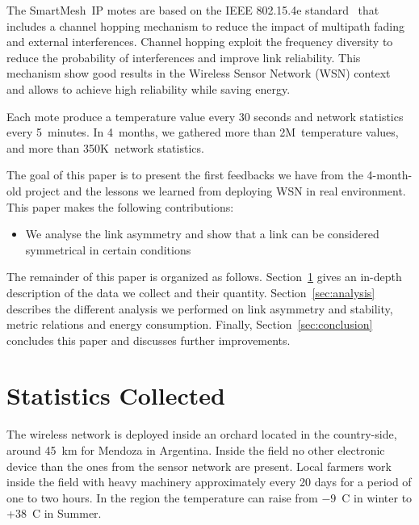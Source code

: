 \documentclass{sig-alternate}
\newcommand{\smip}           {SmartMesh~IP\xspace}
\begin{document}

The \smip motes are based on the IEEE 802.15.4e standard~\cite{std_ieee802154e} that includes a channel hopping mechanism to reduce the impact of multipath fading and external interferences.
Channel hopping exploit the frequency diversity to reduce the probability of interferences and improve link reliability.
This mechanism show good results in the Wireless Sensor Network (WSN) context~\cite{watteyne2010mitigating, watteyne2009reliability} and allows to achieve high reliability while saving energy.


Each mote produce a temperature value every 30 seconds and network statistics every 5~minutes.
In 4~months, we gathered more than 2M~temperature values, and more than 350K~network statistics.


The goal of this paper is to present the first feedbacks we have from the 4-month-old project and the lessons we learned from deploying WSN in real environment.
This paper makes the following contributions:
\begin{itemize}
    \item{We analyse the link asymmetry and show that a link can be considered symmetrical in certain conditions}
\end{itemize}


The remainder of this paper is organized as follows.
Section~\ref{sec:collected} gives an in-depth description of the data we collect and their quantity.
Section~\ref{sec:analysis} describes the different analysis we performed on link asymmetry and stability, metric relations and energy consumption.
Finally, Section~\ref{sec:conclusion} concludes this paper and discusses further improvements.

\section{Statistics Collected}
\label{sec:collected}


The wireless network is deployed inside an orchard located in the country-side, around 45~km for Mendoza in Argentina.
Inside the field no other electronic device than the ones from the sensor network are present.
Local farmers work inside the field with heavy machinery approximately every 20 days for a period of one to two hours.
In the region the temperature can raise from $-9$~C in winter to +38~C in Summer.
\end{document}
